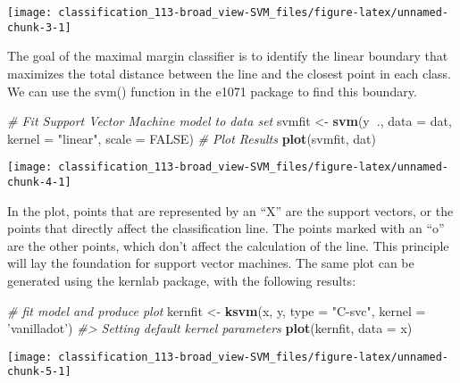 \documentclass[]{book}
\newenvironment{Shaded}{\begin{snugshade}}{\end{snugshade}}
\newcommand{\CommentTok}[1]{\textcolor[rgb]{0.56,0.35,0.01}{\textit{#1}}}
\newcommand{\DataTypeTok}[1]{\textcolor[rgb]{0.13,0.29,0.53}{#1}}
\newcommand{\KeywordTok}[1]{\textcolor[rgb]{0.13,0.29,0.53}{\textbf{#1}}}
\newcommand{\NormalTok}[1]{#1}
\newcommand{\OperatorTok}[1]{\textcolor[rgb]{0.81,0.36,0.00}{\textbf{#1}}}
\newcommand{\OtherTok}[1]{\textcolor[rgb]{0.56,0.35,0.01}{#1}}
\newcommand{\StringTok}[1]{\textcolor[rgb]{0.31,0.60,0.02}{#1}}
\begin{document}
\begin{center}\texttt{[image: classification\_113-broad\_view-SVM\_files/figure-latex/unnamed-chunk-3-1]} \end{center}

The goal of the maximal margin classifier is to identify the linear boundary that maximizes the total distance between the line and the closest point in each class. We can use the svm() function in the e1071 package to find this boundary.

\begin{Shaded}
\begin{Highlighting}[]
\CommentTok{# Fit Support Vector Machine model to data set}
\NormalTok{svmfit <-}\StringTok{ }\KeywordTok{svm}\NormalTok{(y}\OperatorTok{~}\NormalTok{., }\DataTypeTok{data =}\NormalTok{ dat, }\DataTypeTok{kernel =} \StringTok{"linear"}\NormalTok{, }\DataTypeTok{scale =} \OtherTok{FALSE}\NormalTok{)}
\CommentTok{# Plot Results}
\KeywordTok{plot}\NormalTok{(svmfit, dat)}
\end{Highlighting}
\end{Shaded}

\begin{center}\texttt{[image: classification\_113-broad\_view-SVM\_files/figure-latex/unnamed-chunk-4-1]} \end{center}

In the plot, points that are represented by an ``X'' are the support vectors, or the points that directly affect the classification line. The points marked with an ``o'' are the other points, which don't affect the calculation of the line. This principle will lay the foundation for support vector machines. The same plot can be generated using the kernlab package, with the following results:

\begin{Shaded}
\begin{Highlighting}[]
\CommentTok{# fit model and produce plot}
\NormalTok{kernfit <-}\StringTok{ }\KeywordTok{ksvm}\NormalTok{(x, y, }\DataTypeTok{type =} \StringTok{"C-svc"}\NormalTok{, }\DataTypeTok{kernel =} \StringTok{'vanilladot'}\NormalTok{)}
\CommentTok{#>  Setting default kernel parameters}
\KeywordTok{plot}\NormalTok{(kernfit, }\DataTypeTok{data =}\NormalTok{ x)}
\end{Highlighting}
\end{Shaded}

\begin{center}\texttt{[image: classification\_113-broad\_view-SVM\_files/figure-latex/unnamed-chunk-5-1]} \end{center}
\end{document}
